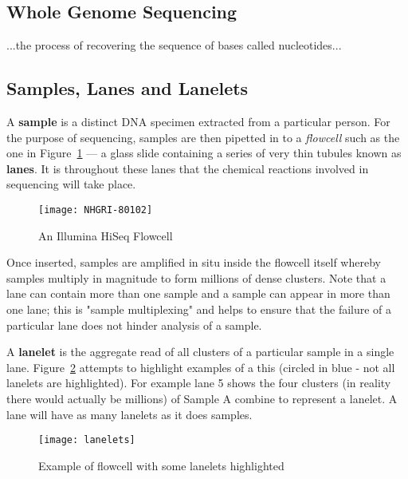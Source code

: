 \subsection{Whole Genome Sequencing}
...the process of recovering the sequence of bases called nucleotides...

\subsection{Samples, Lanes and Lanelets}
\label{chap:samplelanelanelets}

A \textbf{sample} is a distinct DNA specimen extracted from a particular person.
For the purpose of sequencing, samples are then pipetted in to a
\textit{flowcell} such as the one in Figure~\ref{fig:flowcell} --- a glass slide
containing a series of very thin tubules known as \textbf{lanes}.  It is
throughout these lanes that the chemical reactions involved in sequencing will
take place.

\begin{figure}[htbp!]
    \centering
    \texttt{[image: NHGRI-80102]}
    \caption[flowcell]{An Illumina HiSeq Flowcell\citep{img:flowcell}}
    \label{fig:flowcell}
\end{figure}

Once inserted, samples are amplified in situ inside the flowcell itself whereby
samples multiply in magnitude to form millions of dense clusters. Note that a
lane can contain more than one sample and a sample can appear in more than one
lane; this is "sample multiplexing" and helps to ensure that the failure of a
particular lane does not hinder analysis of a sample.

A \textbf{lanelet} is the aggregate read of all clusters of a particular sample
in a single lane. Figure~\ref{fig:lanelets} attempts to highlight examples of a
this (circled in blue - not all lanelets are highlighted). For example lane 5
shows the four clusters (in reality there would actually be millions) of Sample
A combine to represent a lanelet. A lane will have as many lanelets as it does
samples.

\begin{figure}[htbp!]
    \centering
    \texttt{[image: lanelets]}
    \caption[lanelets]{Example of flowcell with some lanelets highlighted}
    \label{fig:lanelets}
\end{figure}


